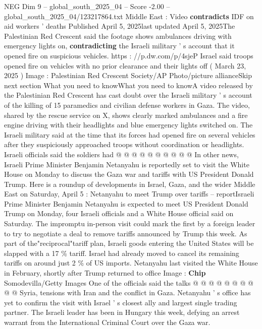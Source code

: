\begin{textsample}{NEG Dim 9 – global\_south\_2025\_04 – Score -2.00 – global\_south\_2025\_04/123217864.txt}  \label{ex:f9_neg_268}
Middle East : Video \textbf{contradicts} IDF on aid workers ' deaths Published April 5, 2025last updated April 5, 2025The Palestinian Red Crescent said the footage shows ambulances driving with emergency lights on, \textbf{contradicting} the Israeli military ' s account that it opened fire on suspicious vehicles. https : //p.dw.com/p/4sjeP Israel said troops opened fire on vehicles with no prior clearance and their lights off ( March 23, 2025 ) Image : Palestinian Red Crescent Society/AP Photo/picture allianceSkip next section What you need to knowWhat you need to knowA video released by the Palestinian Red Crescent has cast doubt over the Israeli military ' s account of the killing of 15 paramedics and civilian defense workers in Gaza.
The video, shared by the rescue service on X, shows clearly marked ambulances and a fire engine driving with their headlights and blue emergency lights switched on.
The Israeli military said at the time that its forces had opened fire on several vehicles after they suspiciously approached troops without coordination or headlights.
Israeli officials said the soldiers had @ @ @ @ @ @ @ @ @ @ In other news, Israeli Prime Minister Benjamin Netanyahu is reportedly set to visit the White House on Monday to discuss the Gaza war and tariffs with US President Donald Trump.
Here is a roundup of developments in Israel, Gaza, and the wider Middle East on Saturday, April 5 : Netanyahu to meet Trump over tariffs -- reportIsraeli Prime Minister Benjamin Netanyahu is expected to meet US President Donald Trump on Monday, four Israeli officials and a White House official said on Saturday.
The impromptu in-person visit could mark the first by a foreign leader to try to negotiate a deal to remove tariffs announced by Trump this week.
As part of the"reciprocal"tariff plan, Israeli goods entering the United States will be slapped with a 17 \% tariff.
Israel had already moved to cancel its remaining tariffs on around just 2 \% of US imports.
Netanyahu last visited the White House in February, shortly after Trump returned to office Image : \textbf{Chip} Somodevilla/Getty Images One of the officials said the talks @ @ @ @ @ @ @ @ @ @ Syria, tensions with Iran and the conflict in Gaza.
Netanyahu ' s office has yet to confirm the visit with Israel ' s closest ally and largest single trading partner.
The Israeli leader has been in Hungary this week, defying an arrest warrant from the International Criminal Court over the Gaza war.

\end{textsample}
